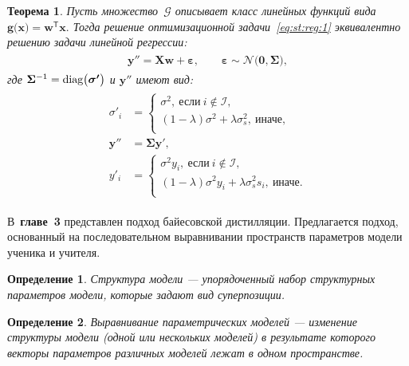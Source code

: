 \documentclass{dissert}
\newtheorem{theorem}{Теорема}
\newtheorem{definition}{Определение}
\begin{document}
\begin{theorem}
\label{theorem:st:reg}
Пусть множество~$\mathcal{G}$ описывает класс линейных функций вида~$\mathbf{g}\bigr(\mathbf{x}\bigr) = \mathbf{w}^{\mathsf{T}}\mathbf{x}.$ Тогда решение оптимизационной задачи~\eqref{eq:st:reg:1} эквивалентно решению задачи линейной регрессии:
\begin{gather}
\label{eq:st:reg:th:st:1}
\begin{aligned}
\mathbf{y''} = \mathbf{X}\mathbf{w} + \bm{\varepsilon},\qquad \bm{\varepsilon} \sim \mathcal{N}\bigr(\mathbf{0}, \bm{\Sigma}\bigr),
\end{aligned}
\end{gather}
где $\bm{\Sigma}^{-1}={\text{\normalfont{diag}}}\bigr(\bm{\sigma'}\bigr)$ и $\mathbf{y''}$ имеют вид:
\begin{gather}
\label{eq:st:reg:th:st:2}
\begin{aligned}
\sigma'_{i} &= \begin{cases}
\sigma^2,~\text{если}~i \not \in \mathcal{I},\\
\left(1-\lambda\right)\sigma^2+\lambda\sigma_s^2,~\text{иначе},\\
\end{cases}\\
\mathbf{y''} &= \bm{\Sigma}\mathbf{y'},\\
y'_i &= \begin{cases}
\sigma^2y_i,~\text{если}~i \not \in \mathcal{I},\\
\left(1-\lambda\right)\sigma^2y_i+\lambda\sigma_s^2s_i,~\text{иначе}.\\
\end{cases}
\end{aligned}
\end{gather}
\end{theorem}

В~\textbf{главе~3} представлен подход байесовской дистилляции. Предлагается подход, основанный на последовательном выравнивании пространств параметров модели ученика и учителя. 
\begin{definition}
\label{def:structure}
Структура модели --- упорядоченный набор структурных параметров модели, которые задают вид суперпозиции.
\end{definition}
\begin{definition}
\label{def:sopos}
Выравнивание параметрических моделей --- изменение структуры модели (одной или нескольких моделей) в результате которого векторы параметров различных моделей лежат в одном пространстве.
\end{definition}
\end{document}
